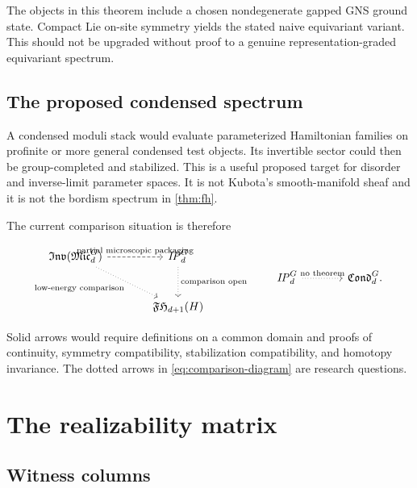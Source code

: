 \documentclass[12pt]{article}
\theoremstyle{definition}
\theoremstyle{remark}
\newcommand{\Mic}{\mathfrak{Mic}}
\newcommand{\Inv}{\mathfrak{Inv}}
\newcommand{\FH}{\mathfrak{FH}}
\newcommand{\Cond}{\mathfrak{Cond}}
\newcommand{\IP}{\mathit{IP}}
\begin{document}
The objects in this theorem include a chosen nondegenerate gapped GNS ground
state.  Compact Lie on-site symmetry yields the stated naive equivariant
variant.  This should not be upgraded without proof to a genuine
representation-graded equivariant spectrum.

\subsection{The proposed condensed spectrum}

A condensed moduli stack would evaluate parameterized Hamiltonian families
on profinite or more general condensed test objects.  Its invertible sector
could then be group-completed and stabilized.  This is a useful proposed
target for disorder and inverse-limit parameter spaces.  It is not Kubota's
smooth-manifold sheaf and it is not the bordism spectrum in
\cref{thm:fh}.

The current comparison situation is therefore

\begin{equation}
\begin{tikzcd}[column sep=large,row sep=large]
\Inv(\Mic_d^G)
  \arrow[r,dashed,"\text{partial microscopic packaging}"]
  \arrow[dr,dotted,swap,"\text{low-energy comparison}"]
& \IP_d^G
  \arrow[d,dotted,"\text{comparison open}"] \\
& \FH_{d+1}(H)
\end{tikzcd}
\qquad
\begin{tikzcd}[column sep=large]
\IP_d^G \arrow[r,dotted,"\text{no theorem}"]
& \Cond_d^G.
\end{tikzcd}
\label{eq:comparison-diagram}
\end{equation}

Solid arrows would require definitions on a common domain and proofs of
continuity, symmetry compatibility, stabilization compatibility, and
homotopy invariance.  The dotted arrows in \cref{eq:comparison-diagram} are
research questions.

\section{The realizability matrix}

\subsection{Witness columns}
\end{document}
